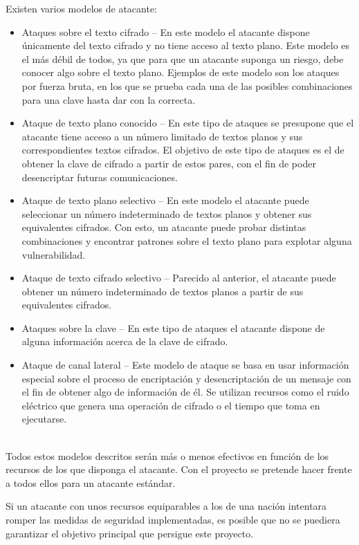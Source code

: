 Existen varios modelos de atacante:

\begin{itemize}
  \item Ataques sobre el texto cifrado -- En este modelo el atacante dispone únicamente
  del texto cifrado y no tiene acceso al texto plano. Este modelo es el más débil de todos,
  ya que para que un atacante suponga un riesgo, debe conocer algo sobre el texto plano.
  Ejemplos de este modelo son los ataques por fuerza bruta, en los que se prueba
  cada una de las posibles combinaciones para una clave hasta dar con la correcta.

  \item Ataque de texto plano conocido -- En este tipo de ataques se presupone
  que el atacante tiene acceso a un número limitado de textos planos y sus
  correspondientes textos cifrados. El objetivo de este tipo de ataques es el de
  obtener la clave de cifrado a partir de estos pares, con el fin de poder
  desencriptar futuras comunicaciones.

  \item Ataque de texto plano selectivo -- En este modelo el atacante puede
  seleccionar un número indeterminado de textos planos y obtener sus equivalentes
  cifrados. Con esto, un atacante puede probar distintas combinaciones y encontrar
  patrones sobre el texto plano para explotar alguna vulnerabilidad.

  \item Ataque de texto cifrado selectivo -- Parecido al anterior, el atacante
  puede obtener un número indeterminado de textos planos a partir de sus
  equivalentes cifrados.

  \item Ataques sobre la clave -- En este tipo de ataques el atacante dispone de
  alguna información acerca de la clave de cifrado.

  \item Ataque de canal lateral -- Este modelo de ataque se basa en usar
  información especial sobre el proceso de encriptación y desencriptación de un
  mensaje con el fin de obtener algo de información de él. Se utilizan recursos
  como el ruido eléctrico que genera una operación de cifrado o el tiempo que
  toma en ejecutarse.
\end{itemize} \emph{\parencite{Reference20}}\\

Todos estos modelos descritos serán más o menos efectivos en función de los
recursos de los que disponga el atacante. Con el proyecto se pretende hacer
frente a todos ellos para un atacante estándar.

Si un atacante con unos recursos equiparables a los de una nación intentara
romper las medidas de seguridad implementadas, es posible que no se puediera
garantizar el objetivo principal que persigue este proyecto.

